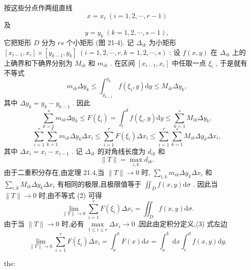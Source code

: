 按这些分点作两组直线
\[
x = {x}_{i}\;\left( {i = 1,2,\cdots ,r - 1}\right)
\]
及
\[
y = {y}_{k}\;\left( {k = 1,2,\cdots ,s - 1}\right) ,
\]
它把矩形 \(D\) 分为 \({rs}\) 个小矩形 (图 21-4). 记 \({\Delta }_{ik}\) 为小矩形 \(\left\lbrack  {{x}_{i - 1},{x}_{i}}\right\rbrack   \times  \left\lbrack  {{y}_{k - 1},{y}_{k}}\right\rbrack  \;\left( {i = 1,2,\cdots ,r,k = 1,2,\cdots ,s}\right)\) ; 设 \(f\left( {x,y}\right)\) 在 \({\Delta }_{ik}\) 上的上确界和下确界分别为 \({M}_{ik}\) 和 \({m}_{ik}\) . 在区间 \(\left\lbrack  {{x}_{i - 1},{x}_{i}}\right\rbrack\) 中任取一点 \({\xi }_{i}\) , 于是就有不等式
\[
{m}_{ik}\Delta {y}_{k} \leq  {\int }_{{y}_{k - 1}}^{{y}_{k}}f\left( {{\xi }_{i},y}\right) \mathrm{d}y \leq  {M}_{ik}\Delta {y}_{k},
\]
其中 \(\Delta {y}_{k} = {y}_{k} - {y}_{k - 1}\) . 因此
\[
\mathop{\sum }\limits_{{k = 1}}^{s}{m}_{ik}\Delta {y}_{k} \leq  F\left( {\xi }_{i}\right)  = {\int }_{c}^{d}f\left( {{\xi }_{i},y}\right) \mathrm{d}y \leq  \mathop{\sum }\limits_{{k = 1}}^{s}{M}_{ik}\Delta {y}_{k},
\]
\[
\mathop{\sum }\limits_{{i = 1}}^{r}\mathop{\sum }\limits_{{k = 1}}^{s}{m}_{ik}\Delta {y}_{k}\Delta {x}_{i} \leq  \mathop{\sum }\limits_{{i = 1}}^{r}F\left( {\xi }_{i}\right) \Delta {x}_{i} \leq  \mathop{\sum }\limits_{{i = 1}}^{r}\mathop{\sum }\limits_{{k = 1}}^{s}{M}_{ik}\Delta {y}_{k}\Delta {x}_{i}, \tag{2}
\]
其中 \(\Delta {x}_{i} = {x}_{i} - {x}_{i - 1}\) . 记 \({\Delta }_{ik}\) 的对角线长度为 \({d}_{ik}\) 和
\[
\parallel T\parallel  = \mathop{\max }\limits_{{i,k}}{d}_{ik}.
\]
由于二重积分存在,由定理 21.4,当 \(\parallel T\parallel  \rightarrow  0\) 时, \(\mathop{\sum }\limits_{{i,k}}{m}_{ik}\Delta {y}_{k}\Delta {x}_{i}\) 和 \(\mathop{\sum }\limits_{{i,k}}{M}_{ik}\Delta {y}_{k}\Delta {x}_{i}\) 有相同的极限,且极限值等于 \({\iint }_{D}f\left( {x,y}\right) \mathrm{d}\sigma\) . 因此当 \(\parallel T\parallel  \rightarrow  0\) 时,由不等式 (2) 可得
\[
\mathop{\lim }\limits_{{\parallel T\parallel  \rightarrow  0}}\mathop{\sum }\limits_{{i = 1}}^{r}F\left( {\xi }_{i}\right) \Delta {x}_{i} = {\iint }_{D}f\left( {x,y}\right) \mathrm{d}\sigma . \tag{3}
\]
由于当 \(\parallel T\parallel  \rightarrow  0\) 时,必有 \(\mathop{\max }\limits_{{1 \leq  i \leq  r}}\Delta {x}_{i} \rightarrow  0\) ,因此由定积分定义,(3) 式左边
\[
\mathop{\lim }\limits_{{\parallel T\parallel  \rightarrow  0}}\mathop{\sum }\limits_{{i = 1}}^{r}F\left( {\xi }_{i}\right) \Delta {x}_{i} = {\int }_{a}^{b}F\left( x\right) \mathrm{d}x = {\int }_{a}^{b}\mathrm{\;d}x{\int }_{c}^{d}f\left( {x,y}\right) \mathrm{d}y.
\]
\begin{theorem}{}{the:}

\end{theorem}

